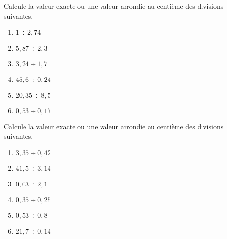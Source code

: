 \begin{exercice} %
Calcule la valeur exacte ou une valeur arrondie au centième des divisions suivantes.
\begin{enumerate} 
 \item $1 \div 2,74$ \dotfill \hspace*{11em}

 \item $5,87 \div 2,3$ \dotfill \hspace*{11em}

 \item $3,24 \div 1,7$ \dotfill \hspace*{11em}

 \item $45,6 \div 0,24$ \dotfill \hspace*{11em}

 \item $20,35 \div 8,5$ \dotfill \hspace*{11em}

 \item $0,53 \div 0,17$ \dotfill \hspace*{11em}

 \end{enumerate}
\end{exercice}


\begin{exercice} %
Calcule la valeur exacte ou une valeur arrondie au centième des divisions suivantes.
\begin{enumerate} 
 \item $3,35 \div 0,42$ \dotfill \hspace*{11em}

 \item $41,5 \div 3,14$ \dotfill \hspace*{11em}

 \item $ 0,03 \div 2,1$ \dotfill \hspace*{11em}

 \item $0,35 \div 0,25$ \dotfill \hspace*{11em}

 \item $0,53 \div 0,8$ \dotfill \hspace*{11em}

 \item $21,7 \div 0,14$ \dotfill \hspace*{11em}

 \end{enumerate}
\end{exercice}


